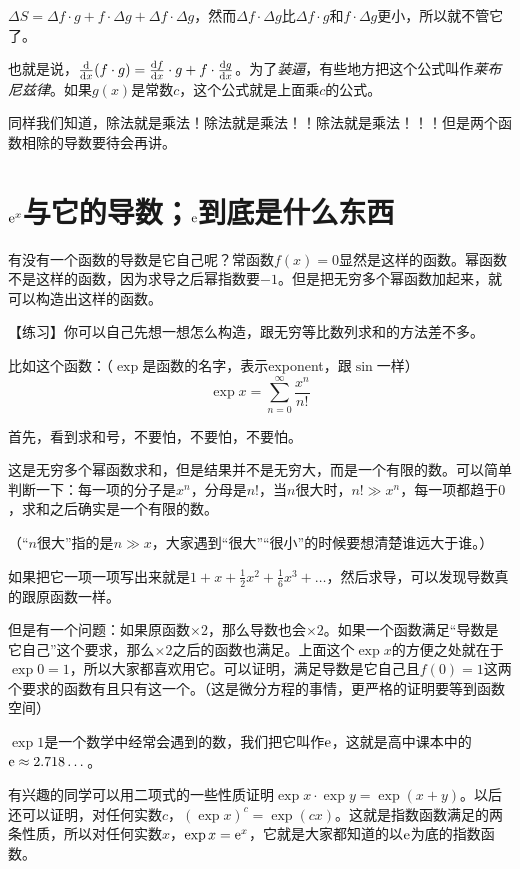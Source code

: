 $\Delta S=\Delta f \cdot g+f \cdot \Delta g+\Delta f \cdot \Delta g$，然而$\Delta f \cdot \Delta g$比$\Delta f \cdot g$和$f \cdot \Delta g$更小，所以就不管它了。

也就是说，$\frac{\mathop{}\!\mathrm{d}}{\mathop{}\!\mathrm{d} x}(f \cdot g)=\frac{\mathop{}\!\mathrm{d} f}{\mathop{}\!\mathrm{d} x} \cdot g+f \cdot \frac{\mathop{}\!\mathrm{d} g}{\mathop{}\!\mathrm{d} x}$。为了\emph{装逼}，有些地方把这个公式叫作\emph{莱布尼兹律}。如果$g(x)$是常数$c$，这个公式就是上面乘$c$的公式。

同样我们知道，除法就是乘法！除法就是乘法！！除法就是乘法！！！但是两个函数相除的导数要待会再讲。
\section{$\mathrm{e}^x$与它的导数；$\mathrm{e}$到底是什么东西}
有没有一个函数的导数是它自己呢？常函数$f(x)=0$显然是这样的函数。幂函数不是这样的函数，因为求导之后幂指数要$-1$。但是把无穷多个幂函数加起来，就可以构造出这样的函数。

【练习】你可以自己先想一想怎么构造，跟无穷等比数列求和的方法差不多。

比如这个函数：（$\exp$是函数的名字，表示exponent，跟$\sin$一样）
\begin{equation*}
\exp x=\sum_{n=0}^{\infty}\frac{x^n}{n!}
\end{equation*}

首先，看到求和号，不要怕，不要怕，不要怕。

这是无穷多个幂函数求和，但是结果并不是无穷大，而是一个有限的数。可以简单判断一下：每一项的分子是$x^n$，分母是$n!$，当$n$很大时，$n! \gg x^n$，每一项都趋于$0$，求和之后确实是一个有限的数。

（“$n$很大”指的是$n \gg x$，大家遇到“很大”“很小”的时候要想清楚谁远大于谁。）

如果把它一项一项写出来就是$1+x+\frac{1}{2}x^2+\frac{1}{6}x^3+\dots$，然后求导，可以发现导数真的跟原函数一样。

但是有一个问题：如果原函数$\times 2$，那么导数也会$\times 2$。如果一个函数满足“导数是它自己”这个要求，那么$\times 2$之后的函数也满足。上面这个$\exp x$的方便之处就在于$\exp 0=1$，所以大家都喜欢用它。可以证明，满足导数是它自己且$f(0)=1$这两个要求的函数有且只有这一个。（这是微分方程的事情，更严格的证明要等到函数空间）

$\exp 1$是一个数学中经常会遇到的数，我们把它叫作$\mathrm{e}$，这就是高中课本中的$\mathrm{e} \approx 2.718 \dots$。

有兴趣的同学可以用二项式的一些性质证明$\exp x \cdot \exp y=\exp(x+y)$。以后还可以证明，对任何实数$c$，$(\exp x)^c=\exp(c x)$。这就是指数函数满足的两条性质，所以对任何实数$x$，$\exp x=\mathrm{e}^x$，它就是大家都知道的以$\mathrm{e}$为底的指数函数。

